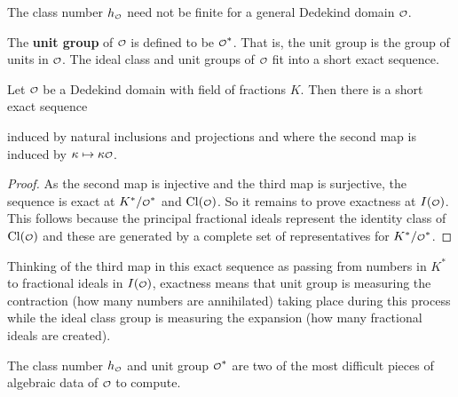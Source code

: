     \begin{remark}\label{rem:general_class_number_not_finite}
      The class number \(h_{\smc{O}}\) need not be finite for a general Dedekind domain \(\smc{O}\).
    \end{remark}
    
    The \textbf{unit group} of \(\smc{O}\) is defined to be \(\smc{O}^{\ast}\). That is, the unit group is the group of units in \(\smc{O}\). The ideal class and unit groups of \(\smc{O}\) fit into a short exact sequence.

    \begin{proposition}\label{prop:ideal_class_group_exact_sequence}
      Let \(\smc{O}\) be a Dedekind domain with field of fractions \(K\). Then there is a short exact sequence
      \begin{center}
      \end{center}
      induced by natural inclusions and projections and where the second map is induced by \(\k \mapsto \k\smc{O}\).
    \end{proposition}
    \begin{proof}
      As the second map is injective and the third map is surjective, the sequence is exact at \(K^{\ast}/\smc{O}^{\ast}\) and \(\Cl(\smc{O})\). So it remains to prove exactness at \(I(\smc{O})\). This follows because the principal fractional ideals represent the identity class of \(\Cl(\smc{O})\) and these are generated by a complete set of representatives for \(K^{\ast}/\smc{O}^{\ast}\).
    \end{proof}

    Thinking of the third map in this exact sequence as passing from numbers in \(K^{\ast}\) to fractional ideals in \(I(\smc{O})\), exactness means that unit group is measuring the contraction (how many numbers are annihilated) taking place during this process while the ideal class group is measuring the expansion (how many fractional ideals are created).
    
    \begin{remark}
      The class number \(h_{\smc{O}}\) and unit group \(\smc{O}^{\ast}\) are two of the most difficult pieces of algebraic data of \(\smc{O}\) to compute.
    \end{remark}

